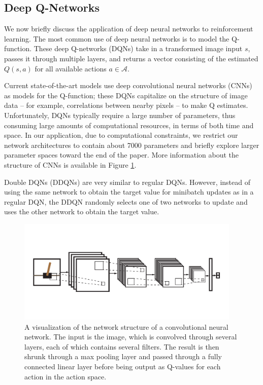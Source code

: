 \documentclass[11pt]{article}
\begin{document}
\subsection{Deep Q-Networks}

We now briefly discuss the application of deep neural networks to reinforcement learning. The most common use of deep neural networks is to model the Q-function. These deep Q-networks (DQNs) take in a transformed image input $s$, passes it through multiple layers, and returns a vector consisting of the estimated $Q(s, a)$ for all available actions $a \in \mathcal{A}$. 

Current state-of-the-art models \cite{mnih2013playing, mnih2015human} use deep convolutional neural networks (CNNs) as models for the Q-function; these DQNs capitalize on the structure of image data -- for example, correlations between nearby pixels -- to make Q estimates. Unfortunately, DQNs typically require a large number of parameters, thus consuming large amounts of computational resources, in terms of both time and space. In our application, due to computational constraints, we restrict our network architectures to contain about 7000 parameters and briefly explore larger parameter spaces toward the end of the paper. More information about the structure of CNNs is available in Figure \ref{fig:cnn}.

Double DQNs (DDQNs) \cite{van2016deep} are very similar to regular DQNs. However, instead of using the same network to obtain the target value for minibatch updates as in a regular DQN, the DDQN randomly selects one of two networks to update and uses the other network to obtain the target value.

\begin{figure}
    \centering
    \includegraphics[trim={0 1cm 0 1cm}, clip, width=0.95\textwidth]{cnn.pdf}
    \caption{A visualization of the network structure of a convolutional neural network. The input is the image, which is convolved through several layers, each of which contains several filters. The result is then shrunk through a max pooling layer and passed through a fully connected linear layer before being output as Q-values for each action in the action space.}
    \label{fig:cnn}
\end{figure}
\end{document}
